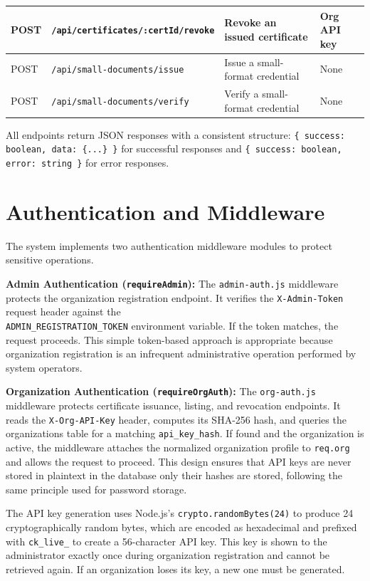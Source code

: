 \begin{table}[hbt!]
\begin{tabularx}{\textwidth}{|p{1.5cm}|X|p{3.5cm}|p{2.5cm}|}
POST & \texttt{/api/certificates/:certId/revoke} & Revoke an issued certificate & Org API key \\ \hline

POST & \texttt{/api/small-documents/issue} & Issue a small-format credential & None \\ \hline

POST & \texttt{/api/small-documents/verify} & Verify a small-format credential & None \\ \hline

\end{tabularx}
\end{table}

All endpoints return JSON responses with a consistent structure: \texttt{\{ success: boolean, data: \{...\} \}} for successful responses and \texttt{\{ success: boolean, error: string \}} for error responses.

\section{Authentication and Middleware}

The system implements two authentication middleware modules to protect sensitive operations.

\textbf{Admin Authentication (\texttt{requireAdmin}):} The \texttt{admin-auth.js} middleware protects the organization registration endpoint. It verifies the \texttt{X-Admin-Token} request header against the \\\texttt{ADMIN\_REGISTRATION\_TOKEN} environment variable. If the token matches, the request proceeds. This simple token-based approach is appropriate because organization registration is an infrequent administrative operation performed by system operators.

\textbf{Organization Authentication (\texttt{requireOrgAuth}):} The \texttt{org-auth.js} middleware protects certificate issuance, listing, and revocation endpoints. It reads the \texttt{X-Org-API-Key} header, computes its SHA-256 hash, and queries the organizations table for a matching \texttt{api\_key\_hash}. If found and the organization is active, the middleware attaches the normalized organization profile to \texttt{req.org} and allows the request to proceed. This design ensures that API keys are never stored in plaintext in the database only their hashes are stored, following the same principle used for password storage.

The API key generation uses Node.js's \texttt{crypto.randomBytes(24)} to produce 24 cryptographically random bytes, which are encoded as hexadecimal and prefixed with \texttt{ck\_live\_} to create a 56-character API key. This key is shown to the administrator exactly once during organization registration and cannot be retrieved again. If an organization loses its key, a new one must be generated.


















